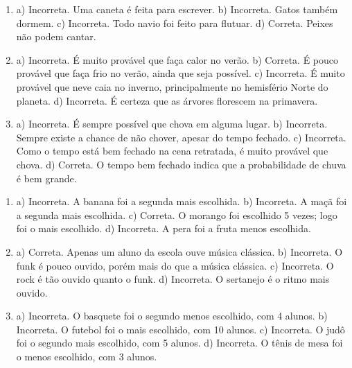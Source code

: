 
\begin{enumerate}
\item
a) Incorreta. Uma caneta é feita para escrever.
b) Incorreta. Gatos também dormem.
c) Incorreta. Todo navio foi feito para flutuar.
d) Correta. Peixes não podem cantar.

\item
a) Incorreta. É muito provável que faça calor no verão.
b) Correta. É pouco provável que faça frio no verão, ainda que seja
possível.
c) Incorreta. É muito provável que neve caia no inverno, principalmente
no hemisfério Norte do planeta.
d) Incorreta. É certeza que as árvores florescem na primavera.

\item
a) Incorreta. É sempre possível que chova em alguma lugar.
b) Incorreta. Sempre existe a chance de não chover, apesar do tempo fechado.
c) Incorreta. Como o tempo está bem fechado na cena retratada, é muito provável que chova.
d) Correta. O tempo bem fechado indica que a probabilidade de chuva é bem grande.
\end{enumerate}


\begin{enumerate}
\item
a) Incorreta. A banana foi a segunda mais escolhida.
b) Incorreta. A maçã foi a segunda mais escolhida.
c) Correta. O morango foi escolhido 5 vezes; logo foi o mais escolhido.
d) Incorreta. A pera foi a fruta menos escolhida.

\item
a) Correta. Apenas um aluno da escola ouve música clássica.
b) Incorreta. O funk é pouco ouvido, porém mais do que a música clássica.
c) Incorreta. O rock é tão ouvido quanto o funk.
d) Incorreta. O sertanejo é o ritmo mais ouvido.

\item
a) Incorreta. O basquete foi o segundo menos escolhido, com 4 alunos.
b) Incorreta. O futebol foi o mais escolhido, com 10 alunos.
c) Incorreta. O judô foi o segundo mais escolhido, com 5 alunos.
d) Incorreta. O tênis de mesa foi o menos escolhido, com 3 alunos.
\end{enumerate}


